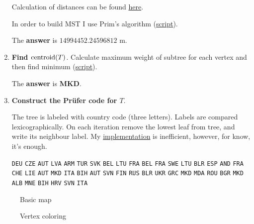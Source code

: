 \documentclass[12pt, a4paper]{article}
\begin{document}
\begin{enumerate}[label=\alph*)]
Calculation of distances can be found
\href{https://github.com/ablearthy-itmo-39828cf299f04949c86/discrete-math-2-hw-1/blob/832da1b/auto/mygraph/distances.py}{here}.

In order to build MST I use Prim's algorithm \cite{algoprim} (\href{https://github.com/ablearthy-itmo-39828cf299f04949c86/discrete-math-2-hw-1/blob/5337ff8/auto/mst.py}{script}).

The \textbf{answer} is \(14994452.24596812\) m.

\item \textbf{Find \(\operatorname{centroid}(T)\)}.
Calculate maximum weight of subtree for each vertex and then find minimum
(\href{https://github.com/ablearthy-itmo-39828cf299f04949c86/discrete-math-2-hw-1/blob/53131e2/auto/centroid.py}{script}).

The \textbf{answer} is \textbf{MKD}.

\item \textbf{Construct the Pr\"ufer code for \(T\)}.

The tree is labeled with country code (three letters). Labels are compared lexicographically.
On each iteration remove the lowest leaf from tree, and write its neighbour label.
My
\href{https://github.com/ablearthy-itmo-39828cf299f04949c86/discrete-math-2-hw-1/blob/b4044c9/auto/prufer_code.py}{implementation}
is inefficient, however, for know, it's enough.

\texttt{DEU} \texttt{CZE} \texttt{AUT} \texttt{LVA} \texttt{ARM} \texttt{TUR} \texttt{SVK} \texttt{BEL} \texttt{LTU} \texttt{FRA} \texttt{BEL} \texttt{FRA} \texttt{SWE} \texttt{LTU} \texttt{BLR} \texttt{ESP} \texttt{AND} \texttt{FRA} \texttt{CHE} \texttt{LIE} \texttt{AUT} \texttt{MKD} \texttt{ITA} \texttt{BIH} \texttt{AUT} \texttt{SVN} \texttt{FIN} \texttt{RUS} \texttt{BLR} \texttt{UKR} \texttt{GRC} \texttt{MKD} \texttt{MDA} \texttt{ROU} \texttt{BGR} \texttt{MKD} \texttt{ALB} \texttt{MNE} \texttt{BIH} \texttt{HRV} \texttt{SVN} \texttt{ITA}
\end{enumerate}



\begin{landscape}
\begin{figure}
\centering

\caption{Basic map}\label{fig:map_basic}
\end{figure}
\end{landscape}

\begin{landscape}
\begin{figure}
\centering

\caption{Vertex coloring}\label{fig:vertex_coloring_map}
\end{figure}
\end{landscape}
\end{document}
